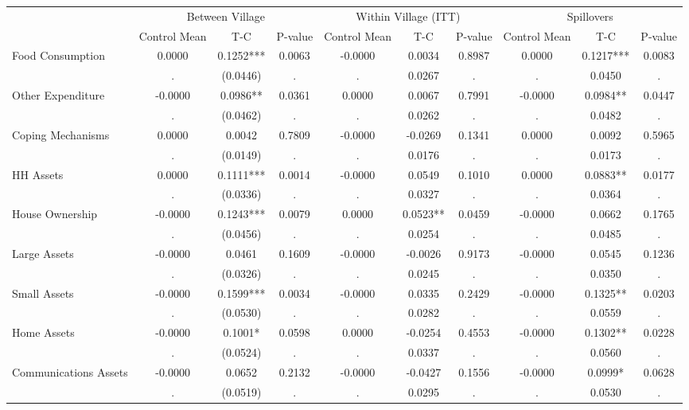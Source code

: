 \begin{tabular}{l*{9}{c}}\hline&\multicolumn{3}{c}{Between Village}&\multicolumn{3}{c}{Within Village (ITT)}&\multicolumn{3}{c}{Spillovers} \\ \cmidrule(r){2-4}\cmidrule(l){5-7}\cmidrule(l){8-10} & {Control Mean} & {T-C} & {P-value} & {Control Mean} & {T-C} & {P-value} & {Control Mean} & {T-C} & {P-value} \\ \midrule  
Food Consumption & 0.0000 & 0.1252*** & 0.0063 & -0.0000 & 0.0034 & 0.8987 & 0.0000 & 0.1217*** & 0.0083 \\
  & . & (0.0446) & . & . & 0.0267 & . & . & 0.0450 & . \\
Other Expenditure & -0.0000 & 0.0986** & 0.0361 & 0.0000 & 0.0067 & 0.7991 & -0.0000 & 0.0984** & 0.0447 \\
  & . & (0.0462) & . & . & 0.0262 & . & . & 0.0482 & . \\
Coping Mechanisms & 0.0000 & 0.0042 & 0.7809 & -0.0000 & -0.0269 & 0.1341 & 0.0000 & 0.0092 & 0.5965 \\
  & . & (0.0149) & . & . & 0.0176 & . & . & 0.0173 & . \\
HH Assets & 0.0000 & 0.1111*** & 0.0014 & -0.0000 & 0.0549 & 0.1010 & 0.0000 & 0.0883** & 0.0177 \\
  & . & (0.0336) & . & . & 0.0327 & . & . & 0.0364 & . \\
House Ownership & -0.0000 & 0.1243*** & 0.0079 & 0.0000 & 0.0523** & 0.0459 & -0.0000 & 0.0662 & 0.1765 \\
  & . & (0.0456) & . & . & 0.0254 & . & . & 0.0485 & . \\
Large Assets & -0.0000 & 0.0461 & 0.1609 & -0.0000 & -0.0026 & 0.9173 & -0.0000 & 0.0545 & 0.1236 \\
  & . & (0.0326) & . & . & 0.0245 & . & . & 0.0350 & . \\
Small Assets & -0.0000 & 0.1599*** & 0.0034 & -0.0000 & 0.0335 & 0.2429 & -0.0000 & 0.1325** & 0.0203 \\
  & . & (0.0530) & . & . & 0.0282 & . & . & 0.0559 & . \\
Home Assets & -0.0000 & 0.1001* & 0.0598 & 0.0000 & -0.0254 & 0.4553 & -0.0000 & 0.1302** & 0.0228 \\
  & . & (0.0524) & . & . & 0.0337 & . & . & 0.0560 & . \\
Communications Assets & -0.0000 & 0.0652 & 0.2132 & -0.0000 & -0.0427 & 0.1556 & -0.0000 & 0.0999* & 0.0628 \\
  & . & (0.0519) & . & . & 0.0295 & . & . & 0.0530 & . \\

\end{tabular}
